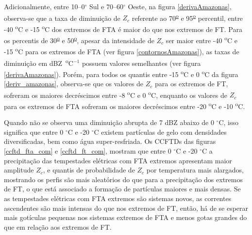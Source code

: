 Adicionalmente, entre 10--0$^{\circ}$ Sul e 70--60$^{\circ}$ Oeste, na figura \ref{derivaAmazonas}, observa-se que a taxa de diminuição de $Z_c$ referente ao 70\textsuperscript{\underline{o}} e 95\textsuperscript{\underline{o}} percentil, entre -40 \textsuperscript{o}C e -15 \textsuperscript{o}C dos extremos de FTA é maior do que nos extremos de FT. Para os percentis de 30\textsuperscript{\underline{o}} e 50\textsuperscript{\underline{o}}, apesar da intensidade de $Z_c$ ser maior entre -40 \textsuperscript{o}C e -15 \textsuperscript{o}C para os extremos de FTA (ver figura \ref{contornosAmazonas}), as taxas de diminuição em dBZ~\textsuperscript{o}C$^{-1}$ possuem valores semelhantes (ver figura \ref{derivaAmazonas}). Porém, para todos os quantis entre -15 \textsuperscript{o}C e 0 \textsuperscript{o}C da figura \ref{deriv_amazonas}, observa-se que os valores de $Z_c$ para os extremos de FT, sofreram os maiores decréscimos entre -8 \textsuperscript{o}C e 0 \textsuperscript{o}C, enquanto os valores de $Z_c$ para os extremos de FTA sofreram os maiores decréscimos entre -20 \textsuperscript{o}C e -10 \textsuperscript{o}C. %

Quando não se observa uma diminuição abrupta de 7 dBZ abaixo de 0 $^{\circ}$C, isso significa que entre 0 $^{\circ}$C e -20 $^{\circ}$C existem partículas de gelo com densidades diversificadas, bem como água super-resfriada. Os CCFTDs das figuras \ref{ccftd_fta_com} e \ref{ccftd_ft_com}, mostram que entre 0 $^{\circ}$C e -20 $^{\circ}$C a precipitação das tempestades elétricas com FTA extremos apresentam maior amplitude  $Z_c$, e quantis de probabilidade de $Z_c$ por temperatura mais alargados, mostrando os perfis são mais aleatórios do que para a precipitação dos extremos de FT, o que está associado a formação de partículas maiores e mais densas. Se as tempestades elétricas com FTA extremos são sistemas novos, as correntes ascendentes são mais intensas do que nos extremos de FT, então, há de se esperar mais gotículas pequenas nos sistemas extremos de FTA e menos gotas grandes do que em relação aos extremos de FT.

